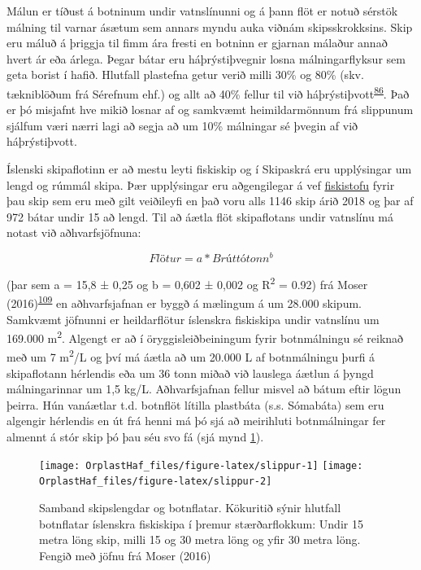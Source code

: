 \documentclass[icelandic,]{book}
\begin{document}
Málun er tíðust á botninum undir vatnslínunni og á þann flöt er notuð sérstök málning til varnar ásætum sem annars myndu auka viðnám skipsskrokksins. Skip eru máluð á þriggja til fimm ára fresti en botninn er gjarnan málaður annað hvert ár eða árlega. Þegar bátar eru háþrýstiþvegnir losna málningarflyksur sem geta borist í hafið. Hlutfall plastefna getur verið milli 30\% og 80\% (skv. tækniblöðum frá Sérefnum ehf.) og allt að 40\% fellur til við háþrýstiþvott\textsuperscript{\protect\hyperlink{ref-Verschoor2016}{86}}. Það er þó misjafnt hve mikið losnar af og samkvæmt heimildarmönnum frá slippunum sjálfum væri nærri lagi að segja að um 10\% málningar sé þvegin af við háþrýstiþvott.

Íslenski skipaflotinn er að mestu leyti fiskiskip og í Skipaskrá eru upplýsingar um lengd og rúmmál skipa. Þær upplýsingar eru aðgengilegar á vef \href{http://www.fiskistofa.is/}{fiskistofu} fyrir þau skip sem eru með gilt veiðileyfi en það voru alls 1146 skip árið 2018 og þar af 972 bátar undir 15 að lengd. Til að áætla flöt skipaflotans undir vatnslínu má notast við aðhvarfsjöfnuna:

\begin{equation} 
  Flötur = a*Brúttótonn^b
  \label{eq:WSA}
\end{equation}

(þar sem a = 15,8 ± 0,25 og b = 0,602 ± 0,002 og R\textsuperscript{2} = 0.92) frá Moser (2016)\textsuperscript{\protect\hyperlink{ref-Moser2016}{109}} en aðhvarfsjafnan er byggð á mælingum á um 28.000 skipum. Samkvæmt jöfnunni er heildarflötur íslenskra fiskiskipa undir vatnslínu um 169.000 m\textsuperscript{2}. Algengt er að í öryggisleiðbeiningum fyrir botnmálningu sé reiknað með um 7 m\textsuperscript{2}/L og því má áætla að um 20.000 L af botnmálningu þurfi á skipaflotann hérlendis eða um 36 tonn miðað við lauslega áætlun á þyngd málningarinnar um 1,5 kg/L. Aðhvarfsjafnan fellur misvel að bátum eftir lögun þeirra. Hún vanáætlar t.d. botnflöt lítilla plastbáta (s.s. Sómabáta) sem eru algengir hérlendis en út frá henni má þó sjá að meirihluti botnmálningar fer almennt á stór skip þó þau séu svo fá (sjá mynd \ref{fig:slippur}).

\begin{figure}

{\centering \texttt{[image: OrplastHaf\_files/figure-latex/slippur-1]} \texttt{[image: OrplastHaf\_files/figure-latex/slippur-2]} 

}

\caption{Samband skipslengdar og botnflatar. Kökuritið sýnir hlutfall botnflatar íslenskra fiskiskipa í þremur stærðarflokkum: Undir 15 metra löng skip, milli 15 og 30 metra löng og yfir 30 metra löng. Fengið með jöfnu frá Moser (2016)}\label{fig:slippur}
\end{figure}
\end{document}
